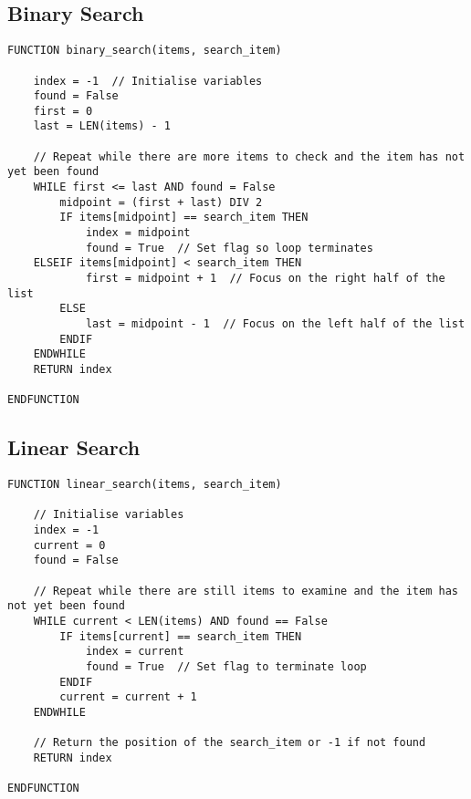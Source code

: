 \documentclass[a4paper,11pt]{article}
\begin{document}
\subsection{Binary Search}
\begin{Verbatim}[breaklines=true, breakanywhere=true]
FUNCTION binary_search(items, search_item) 
    
    index = -1  // Initialise variables
    found = False
    first = 0
    last = LEN(items) - 1

    // Repeat while there are more items to check and the item has not yet been found
    WHILE first <= last AND found = False
        midpoint = (first + last) DIV 2
        IF items[midpoint] == search_item THEN  
            index = midpoint
            found = True  // Set flag so loop terminates
	ELSEIF items[midpoint] < search_item THEN
            first = midpoint + 1  // Focus on the right half of the list
        ELSE 
            last = midpoint - 1  // Focus on the left half of the list
        ENDIF
    ENDWHILE
    RETURN index
    
ENDFUNCTION
\end{Verbatim}
\subsection{Linear Search}
\begin{Verbatim}[breaklines=true, breakanywhere=true]
FUNCTION linear_search(items, search_item)

    // Initialise variables
    index = -1
    current = 0 
    found = False
    
    // Repeat while there are still items to examine and the item has not yet been found 
    WHILE current < LEN(items) AND found == False
        IF items[current] == search_item THEN
       	    index = current
       	    found = True  // Set flag to terminate loop
        ENDIF
        current = current + 1
    ENDWHILE
        
    // Return the position of the search_item or -1 if not found
    RETURN index

ENDFUNCTION 
\end{Verbatim}
\end{document}
